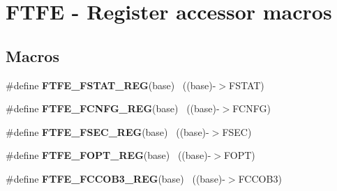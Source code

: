 \hypertarget{group___f_t_f_e___register___accessor___macros}{}\section{F\+T\+F\+E -\/ Register accessor macros}
\label{group___f_t_f_e___register___accessor___macros}
\subsection*{Macros}
\begin{DoxyCompactItemize}
\item 
\hypertarget{group___f_t_f_e___register___accessor___macros_gae8cc0892eb13f8abdb3e6a1f338da008}{}\#define {\bfseries F\+T\+F\+E\+\_\+\+F\+S\+T\+A\+T\+\_\+\+R\+E\+G}(base)                                      ~((base)-\/$>$F\+S\+T\+A\+T)\label{group___f_t_f_e___register___accessor___macros_gae8cc0892eb13f8abdb3e6a1f338da008}

\item 
\hypertarget{group___f_t_f_e___register___accessor___macros_ga477b329c3e07a5ea7856d1d3fbe81bc9}{}\#define {\bfseries F\+T\+F\+E\+\_\+\+F\+C\+N\+F\+G\+\_\+\+R\+E\+G}(base)                                      ~((base)-\/$>$F\+C\+N\+F\+G)\label{group___f_t_f_e___register___accessor___macros_ga477b329c3e07a5ea7856d1d3fbe81bc9}

\item 
\hypertarget{group___f_t_f_e___register___accessor___macros_ga34327c2fb70c8c0e4a1293f5d5b889e4}{}\#define {\bfseries F\+T\+F\+E\+\_\+\+F\+S\+E\+C\+\_\+\+R\+E\+G}(base)                                        ~((base)-\/$>$F\+S\+E\+C)\label{group___f_t_f_e___register___accessor___macros_ga34327c2fb70c8c0e4a1293f5d5b889e4}

\item 
\hypertarget{group___f_t_f_e___register___accessor___macros_gafe2e5c853139da50b56f8c926e3259b3}{}\#define {\bfseries F\+T\+F\+E\+\_\+\+F\+O\+P\+T\+\_\+\+R\+E\+G}(base)                                        ~((base)-\/$>$F\+O\+P\+T)\label{group___f_t_f_e___register___accessor___macros_gafe2e5c853139da50b56f8c926e3259b3}

\item 
\hypertarget{group___f_t_f_e___register___accessor___macros_ga30063e4fc5ebedaa5e29360ce15e666c}{}\#define {\bfseries F\+T\+F\+E\+\_\+\+F\+C\+C\+O\+B3\+\_\+\+R\+E\+G}(base)                                    ~((base)-\/$>$F\+C\+C\+O\+B3)\label{group___f_t_f_e___register___accessor___macros_ga30063e4fc5ebedaa5e29360ce15e666c}


\end{DoxyCompactItemize}
